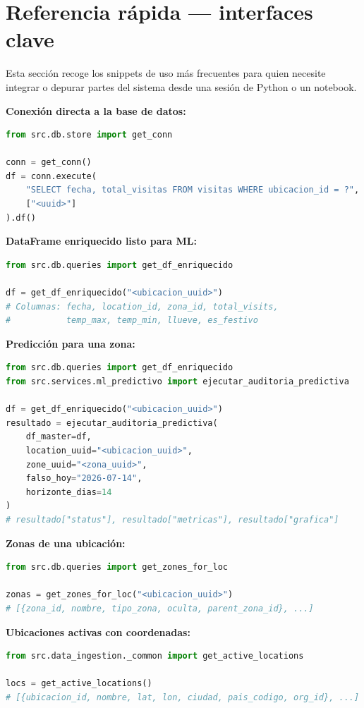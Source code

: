 \documentclass[12pt, a4paper]{article}
\begin{document}
\section{Referencia rápida — interfaces clave}

Esta sección recoge los snippets de uso más frecuentes para quien necesite integrar o depurar partes del sistema desde una sesión de Python o un notebook.

\textbf{Conexión directa a la base de datos:}
\begin{lstlisting}[language=Python]
from src.db.store import get_conn

conn = get_conn()
df = conn.execute(
    "SELECT fecha, total_visitas FROM visitas WHERE ubicacion_id = ?",
    ["<uuid>"]
).df()
\end{lstlisting}

\textbf{DataFrame enriquecido listo para ML:}
\begin{lstlisting}[language=Python]
from src.db.queries import get_df_enriquecido

df = get_df_enriquecido("<ubicacion_uuid>")
# Columnas: fecha, location_id, zona_id, total_visits,
#           temp_max, temp_min, llueve, es_festivo
\end{lstlisting}

\textbf{Predicción para una zona:}
\begin{lstlisting}[language=Python]
from src.db.queries import get_df_enriquecido
from src.services.ml_predictivo import ejecutar_auditoria_predictiva

df = get_df_enriquecido("<ubicacion_uuid>")
resultado = ejecutar_auditoria_predictiva(
    df_master=df,
    location_uuid="<ubicacion_uuid>",
    zone_uuid="<zona_uuid>",
    falso_hoy="2026-07-14",
    horizonte_dias=14
)
# resultado["status"], resultado["metricas"], resultado["grafica"]
\end{lstlisting}

\textbf{Zonas de una ubicación:}
\begin{lstlisting}[language=Python]
from src.db.queries import get_zones_for_loc

zonas = get_zones_for_loc("<ubicacion_uuid>")
# [{zona_id, nombre, tipo_zona, oculta, parent_zona_id}, ...]
\end{lstlisting}

\textbf{Ubicaciones activas con coordenadas:}
\begin{lstlisting}[language=Python]
from src.data_ingestion._common import get_active_locations

locs = get_active_locations()
# [{ubicacion_id, nombre, lat, lon, ciudad, pais_codigo, org_id}, ...]
\end{lstlisting}
\end{document}

